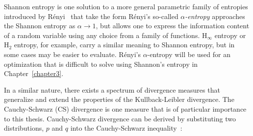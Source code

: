 Shannon entropy is one solution to a more general parametric family of
entropies introduced by R\'{e}nyi~\cite{renyi1961measures} that take the
form
%
%
R\'{e}nyi's so-called \textit{$\alpha$-entropy} approaches the Shannon entropy as $\alpha
\rightarrow 1$, but allows one to express the information content of a
random variable using any choice from a family of functions. $\text{H}_{\infty}$
entropy or $\text{H}_{2}$ entropy, for example, carry a similar meaning to
Shannon entropy, but in some cases may be easier to evaluate.
R\'{e}nyi's $\alpha$-entropy will be
used for an optimization that is difficult to solve using Shannon's entropy in
Chapter~\ref{chapter3}.

In a similar nature, there exists a spectrum of divergence measures that
generalize and extend the properties of the Kullback-Leibler divergence. The
Cauchy-Schwarz (CS) divergence is one measure that is of
particular importance to this thesis. Cauchy-Schwarz divergence can be derived by
substituting two
distributions, $p$ and $q$ into the Cauchy-Schwarz inequality~\cite{rudin1964principles}:
%

